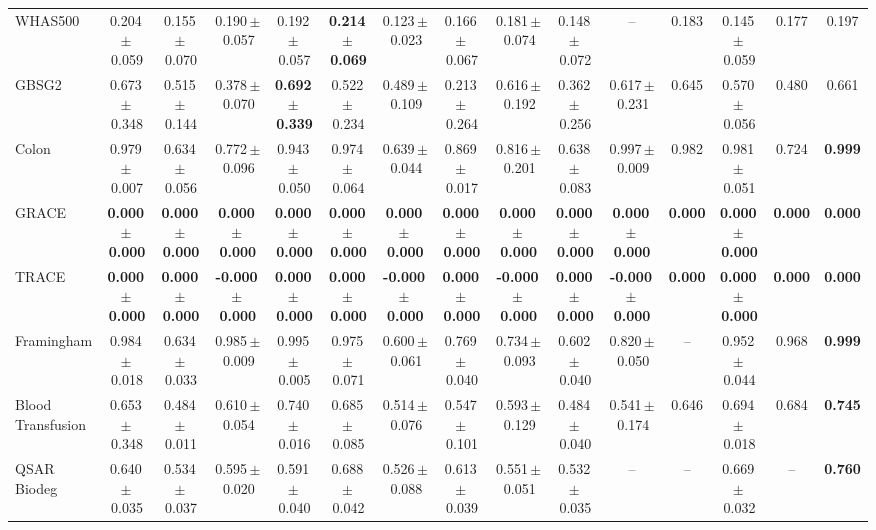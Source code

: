 \documentclass[8pt]{extarticle}
\begin{document}
\begin{longtable}{l*{14}{c}}
WHAS500 & 0.204\,$\pm$\,0.059 & 0.155\,$\pm$\,0.070 & 0.190\,$\pm$\,0.057 & 0.192\,$\pm$\,0.057 & \textbf{0.214\,$\pm$\,0.069} & 0.123\,$\pm$\,0.023 & 0.166\,$\pm$\,0.067 & 0.181\,$\pm$\,0.074 & 0.148\,$\pm$\,0.072 & -- & 0.183 & 0.145\,$\pm$\,0.059 & 0.177 & 0.197 \\
GBSG2 & 0.673\,$\pm$\,0.348 & 0.515\,$\pm$\,0.144 & 0.378\,$\pm$\,0.070 & \textbf{0.692\,$\pm$\,0.339} & 0.522\,$\pm$\,0.234 & 0.489\,$\pm$\,0.109 & 0.213\,$\pm$\,0.264 & 0.616\,$\pm$\,0.192 & 0.362\,$\pm$\,0.256 & 0.617\,$\pm$\,0.231 & 0.645 & 0.570\,$\pm$\,0.056 & 0.480 & 0.661 \\
Colon & 0.979\,$\pm$\,0.007 & 0.634\,$\pm$\,0.056 & 0.772\,$\pm$\,0.096 & 0.943\,$\pm$\,0.050 & 0.974\,$\pm$\,0.064 & 0.639\,$\pm$\,0.044 & 0.869\,$\pm$\,0.017 & 0.816\,$\pm$\,0.201 & 0.638\,$\pm$\,0.083 & 0.997\,$\pm$\,0.009 & 0.982 & 0.981\,$\pm$\,0.051 & 0.724 & \textbf{0.999} \\
GRACE & \textbf{0.000\,$\pm$\,0.000} & \textbf{0.000\,$\pm$\,0.000} & \textbf{0.000\,$\pm$\,0.000} & \textbf{0.000\,$\pm$\,0.000} & \textbf{0.000\,$\pm$\,0.000} & \textbf{0.000\,$\pm$\,0.000} & \textbf{0.000\,$\pm$\,0.000} & \textbf{0.000\,$\pm$\,0.000} & \textbf{0.000\,$\pm$\,0.000} & \textbf{0.000\,$\pm$\,0.000} & \textbf{0.000} & \textbf{0.000\,$\pm$\,0.000} & \textbf{0.000} & \textbf{0.000} \\
TRACE & \textbf{0.000\,$\pm$\,0.000} & \textbf{0.000\,$\pm$\,0.000} & \textbf{-0.000\,$\pm$\,0.000} & \textbf{0.000\,$\pm$\,0.000} & \textbf{0.000\,$\pm$\,0.000} & \textbf{-0.000\,$\pm$\,0.000} & \textbf{0.000\,$\pm$\,0.000} & \textbf{-0.000\,$\pm$\,0.000} & \textbf{0.000\,$\pm$\,0.000} & \textbf{-0.000\,$\pm$\,0.000} & \textbf{0.000} & \textbf{0.000\,$\pm$\,0.000} & \textbf{0.000} & \textbf{0.000} \\
Framingham & 0.984\,$\pm$\,0.018 & 0.634\,$\pm$\,0.033 & 0.985\,$\pm$\,0.009 & 0.995\,$\pm$\,0.005 & 0.975\,$\pm$\,0.071 & 0.600\,$\pm$\,0.061 & 0.769\,$\pm$\,0.040 & 0.734\,$\pm$\,0.093 & 0.602\,$\pm$\,0.040 & 0.820\,$\pm$\,0.050 & -- & 0.952\,$\pm$\,0.044 & 0.968 & \textbf{0.999} \\
Blood Transfusion & 0.653\,$\pm$\,0.348 & 0.484\,$\pm$\,0.011 & 0.610\,$\pm$\,0.054 & 0.740\,$\pm$\,0.016 & 0.685\,$\pm$\,0.085 & 0.514\,$\pm$\,0.076 & 0.547\,$\pm$\,0.101 & 0.593\,$\pm$\,0.129 & 0.484\,$\pm$\,0.040 & 0.541\,$\pm$\,0.174 & 0.646 & 0.694\,$\pm$\,0.018 & 0.684 & \textbf{0.745} \\
QSAR Biodeg & 0.640\,$\pm$\,0.035 & 0.534\,$\pm$\,0.037 & 0.595\,$\pm$\,0.020 & 0.591\,$\pm$\,0.040 & 0.688\,$\pm$\,0.042 & 0.526\,$\pm$\,0.088 & 0.613\,$\pm$\,0.039 & 0.551\,$\pm$\,0.051 & 0.532\,$\pm$\,0.035 & -- & -- & 0.669\,$\pm$\,0.032 & -- & \textbf{0.760} \\

\end{longtable}
\end{document}
